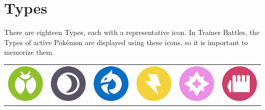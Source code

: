 \chapter{Types}
There are eighteen Types, each with a representative icon.
In Trainer Battles, the Types of active Pokémon are displayed
 using these icons, so it is important to memorize them.
\begin{table}[h]
  \begin{tabular}{c c c c c c}
  \includegraphics[scale=.25]{images/bug.png} &
    \includegraphics[scale=.25]{images/dark.png} &
    \includegraphics[scale=.25]{images/dragon.png} &
    \includegraphics[scale=.25]{images/electric.png} &
    \includegraphics[scale=.25]{images/fairy.png} &
    \includegraphics[scale=.25]{images/fighting.png} \\

\end{tabular}
\end{table}
